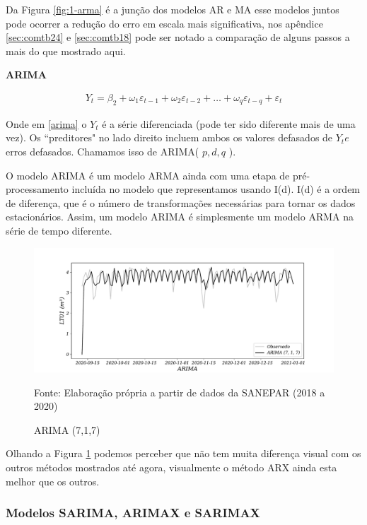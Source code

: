Da Figura \ref{fig:1-arma} é a junção dos modelos AR e MA esse modelos juntos pode ocorrer a redução do erro em escala mais significativa, nos apêndice \ref{sec:comtb24} e \ref{sec:comtb18} pode ser notado a comparação de alguns passos a mais do que mostrado aqui.

\textbf{ARIMA}

\begin{eqnarray}
	Y_t = \beta_2 + \omega_1\varepsilon_{t-1} + \omega_2 \varepsilon_{t-2} +\ldots+ \omega_q \varepsilon_{t-q} + \varepsilon_t \label{arima}
\end{eqnarray}


Onde em \eqref{arima} o $Y_t$ é a série diferenciada (pode ter sido diferente mais de uma vez). Os ``preditores" no lado direito incluem ambos os valores defasados de $Y_t e$ erros defasados. Chamamos isso de ARIMA( $p, d, q$ ).

O modelo ARIMA é um modelo ARMA ainda com uma etapa de pré-processamento incluída no modelo que representamos usando I(d). I(d) é a ordem de diferença, que é o número de transformações necessárias para tornar os dados estacionários. Assim, um modelo ARIMA é simplesmente um modelo ARMA na série de tempo diferente.

\begin{figure}[H]
	\centering
	\caption{ARIMA (7,1,7)  }
	\label{fig:1-arima}
	\includegraphics[width=1\linewidth]{Modelos/Figuras/1-ARIMA}
	
	Fonte: Elaboração própria a partir de dados da SANEPAR (2018 a 2020)
\end{figure}

Olhando a Figura \ref{fig:1-arima} podemos perceber que não tem muita diferença visual com os outros métodos mostrados até agora, visualmente o método ARX ainda esta melhor que os outros.  


\subsubsection{Modelos SARIMA, ARIMAX e SARIMAX}

